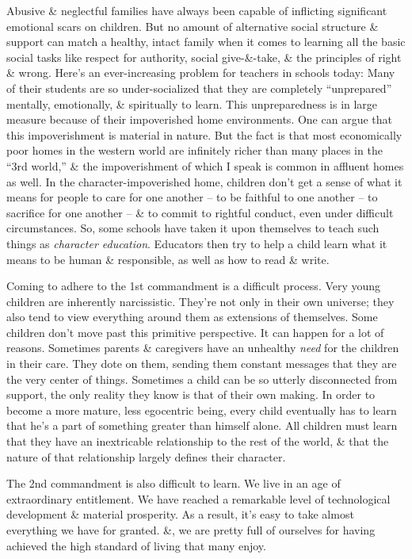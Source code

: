 \documentclass{article}
\numberwithin{equation}{section}
\begin{document}
Abusive \& neglectful families have always been capable of inflicting significant emotional scars on children. But no amount of alternative social structure \& support can match a healthy, intact family when it comes to learning all the basic social tasks like respect for authority, social give-\&-take, \& the principles of right \& wrong. Here's an ever-increasing problem for teachers in schools today: Many of their students are so under-socialized that they are completely ``unprepared'' mentally, emotionally, \& spiritually to learn. This unpreparedness is in large measure because of their impoverished home environments. One can argue that this impoverishment is material in nature. But the fact is that most economically poor homes in the western world are infinitely richer than many places in the ``3rd world,'' \& the impoverishment of which I speak is common in affluent homes as well. In the character-impoverished home, children don't get a sense of what it means for people to care for one another -- to be faithful to one another -- to sacrifice for one another -- \& to commit to rightful conduct, even under difficult circumstances. So, some schools have taken it upon themselves to teach such things as \textit{character education}. Educators then try to help a child learn what it means to be human \& responsible, as well as how to read \& write.

Coming to adhere to the 1st commandment is a difficult process. Very young children are inherently narcissistic. They're not only in their own universe; they also tend to view everything around them as extensions of themselves. Some children don't move past this primitive perspective. It can happen for a lot of reasons. Sometimes parents \& caregivers have an unhealthy \textit{need} for the children in their care. They dote on them, sending them constant messages that they are the very center of things. Sometimes a child can be so utterly disconnected from support, the only reality they know is that of their own making. In order to become a more mature, less egocentric being, every child eventually has to learn that he's a part of something greater than himself alone. All children must learn that they have an inextricable relationship to the rest of the world, \& that the nature of that relationship largely defines their character.

The 2nd commandment is also difficult to learn. We live in an age of extraordinary entitlement. We have reached a remarkable level of technological development \& material prosperity. As a result, it's easy to take almost everything we have for granted. \&, we are pretty full of ourselves for having achieved the high standard of living that many enjoy.
\end{document}

